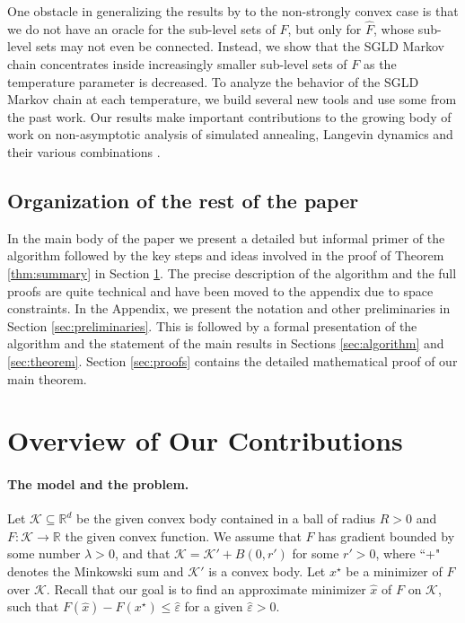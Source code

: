 \documentclass[final,12pt]{colt2018} %
\begin{document}
{One obstacle in generalizing the results by \cite{Simulated_Annealing_Nonassymptotic}  to the non-strongly convex case is that we do not have an oracle for the sub-level sets of $F$, but only for $\hat{F}$, whose sub-level sets may not even be connected.
%
Instead, we show that the SGLD Markov chain concentrates inside increasingly smaller {sub-level sets} of $F$ as the temperature parameter is decreased.
%
  To analyze the behavior of the SGLD Markov chain at each temperature, we build several new tools and use some from  the past work.
%
%
Our results make important contributions  to the growing body of work on non-asymptotic analysis of simulated annealing, Langevin dynamics and their various combinations \citep{raginsky2017non,BubeckEL15,welling2011bayesian,lee2017convergence}.



\subsection{Organization of the rest of the paper}
In the main body of the paper we present  a detailed but informal primer of the algorithm followed by the key steps and ideas involved in the proof of Theorem \ref{thm:summary} in Section \ref{sec:overview}.
%
%
The precise description of the algorithm and the full proofs are quite technical and have been moved to the appendix due to space constraints.
In the Appendix, we present the notation and other preliminaries in Section \ref{sec:preliminaries}.
%
This is followed by a formal presentation of the algorithm and the statement of the main results in Sections \ref{sec:algorithm} and \ref{sec:theorem}.
%
Section \ref{sec:proofs} contains the detailed mathematical proof of our main theorem.


\section{Overview of Our Contributions}\label{sec:overview}


\paragraph{The model and the problem.}
Let $\mathcal{K} \subseteq \mathbb{R}^d$ be the given convex body contained in a ball of radius $R>0$ and $F: \mathcal{K} \rightarrow \mathbb{R}$ the given  convex function.  We assume that $F$ has gradient bounded by some number $\lambda >0$, and that $\mathcal{K}= \mathcal{K}' + B(0,r')$ for some $r'>0$, where ``+" denotes the Minkowski sum and $\mathcal{K}'$ is a convex body.
%
Let  $x^\star$ be a minimizer of $F$  over $\mathcal{K}$.
%
Recall that our goal is to find an approximate minimizer $\hat{x}$ of $F$ on $\mathcal{K}$, such that $F(\hat{x}) - F(x^\star) \leq \hat{\varepsilon}$ for a given $\hat{\varepsilon}>0$.
%

}
\end{document}
